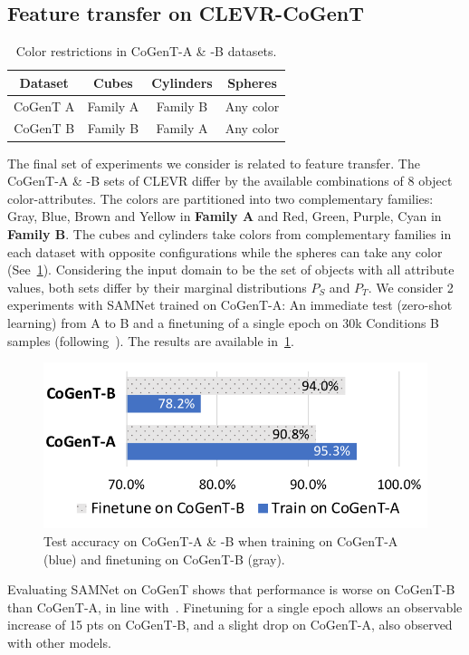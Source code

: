 \subsection{Feature transfer on CLEVR-CoGenT}
\label{sec:feature}
\begin{table}[ht]
	\centering
		\begin{tabular}{cccc}
			\toprule
			Dataset	& Cubes	& Cylinders &	Spheres	\\
			\midrule
			CoGenT A &  Family A  & Family B 	&	Any color  \\
			CoGenT B	&	Family B  &	Family A	&	Any color \\
			\bottomrule
		\end{tabular}
	\caption{Color restrictions in CoGenT-A \& -B datasets.}
	\label{tab:cogent_conditions}
\end{table}

The final set of experiments we consider is related to feature transfer.
The CoGenT-A \& -B sets of CLEVR differ by the available combinations of 8 object color-attributes.
The colors are partitioned into two complementary families: 
Gray, Blue, Brown and Yellow in \textbf{Family A} and Red, Green, Purple, Cyan in \textbf{Family B}. 
The cubes and cylinders take colors from complementary families in each dataset with opposite configurations while
the spheres can take any color (See~\cref{tab:cogent_conditions}). 
Considering the input domain to be the set of objects with all attribute values, both sets differ by their marginal distributions $P_S$ and $P_T$. We consider 2 experiments with SAMNet trained on CoGenT-A: An immediate test (zero-shot learning) from A to B and a finetuning of a single epoch on 30k Conditions B samples (following~\cite{johnson2017inferring, mascharka2018transparency, perez2018film, marois2018transfer}). The results are available in~\cref{fig:CoGenT-B-results}.

\begin{figure}[!t]
	\centering
	\includegraphics[width=0.8\columnwidth]{img/results/CoGenT_B_results.pdf}
	\caption{Test accuracy on CoGenT-A \& -B when training on CoGenT-A (blue) and finetuning on CoGenT-B (gray).}
	\label{fig:CoGenT-B-results}
\end{figure}
Evaluating SAMNet on CoGenT shows that performance is worse on CoGenT-B than CoGenT-A, in line with~\cite{johnson2017inferring, mascharka2018transparency, perez2018film}. Finetuning for a single epoch allows an observable increase of 15 pts on CoGenT-B, and a slight drop on CoGenT-A, also observed with other models.